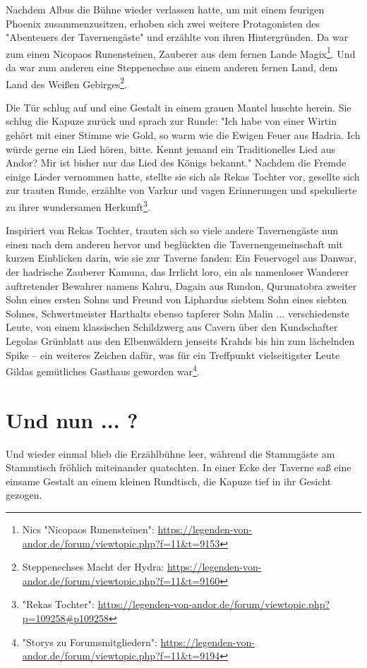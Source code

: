 Nachdem Albus die Bühne wieder verlassen hatte, um mit einem feurigen Phoenix zusammenzusitzen, erhoben sich zwei weitere Protagonisten des "Abenteuers der Tavernengäste" und erzählte von ihren Hintergründen. Da war zum einen Nicopaos Runensteinen, Zauberer aus dem fernen Lande Magix\footnote{Nics "Nicopaos Runensteinen": \url{https://legenden-von-andor.de/forum/viewtopic.php?f=11&t=9153}}. Und da war zum anderen eine Steppenechse aus einem anderen fernen Land, dem Land des Weißen Gebirges\footnote{Steppenechses Macht der Hydra: \url{https://legenden-von-andor.de/forum/viewtopic.php?f=11&t=9160}}.

Die Tür schlug auf und eine Gestalt in einem grauen Mantel huschte herein. Sie schlug die Kapuze zurück und sprach zur Runde: "Ich habe von einer Wirtin gehört mit einer Stimme wie Gold, so warm wie die Ewigen Feuer aus Hadria. Ich würde gerne ein Lied hören, bitte. Kennt jemand ein Traditionelles Lied aus Andor? Mir ist bisher nur das Lied des Königs bekannt." Nachdem die Fremde einige Lieder vernommen hatte, stellte sie sich als Rekas Tochter vor, gesellte sich zur trauten Runde, erzählte von Varkur und vagen Erinnerungen und spekulierte zu ihrer wundersamen Herkunft\footnote{"Rekas Tochter": \url{https://legenden-von-andor.de/forum/viewtopic.php?p=109258\#p109258}}. 

Inspiriert von Rekas Tochter, trauten sich so viele andere Tavernengäste nun einen nach dem anderen hervor und beglückten die Tavernengemeinschaft mit kurzen Einblicken darin, wie sie zur Taverne fanden: Ein Feuervogel aus Danwar, der hadrische Zauberer Kamuna, das Irrlicht loro, ein als namenloser Wanderer auftretender Bewahrer namens Kahru, Dagain aus Rundon, Qurunatobra zweiter Sohn eines ersten Sohns und Freund von Liphardus siebtem Sohn eines siebten Sohnes, Schwertmeister Harthalts ebenso tapferer Sohn Malin ... verschiedenste Leute, von einem klassischen Schildzwerg aus Cavern über den Kundschafter Legolas Grünblatt aus den Elbenwäldern jenseits Krahds bis hin zum lächelnden Spike -- ein weiteres Zeichen dafür, was für ein Treffpunkt vielseitigster Leute Gildas gemütliches Gasthaus geworden war\footnote{"Storys zu Forumsmitgliedern": \url{https://legenden-von-andor.de/forum/viewtopic.php?f=11&t=9194}}.

\newpage
\section{Und nun ... ?}

Und wieder einmal blieb die Erzählbühne leer, während die Stammgäste am Stammtisch fröhlich miteinander quatschten. In einer Ecke der Taverne saß eine einsame Gestalt an einem kleinen Rundtisch, die Kapuze tief in ihr Gesicht gezogen. 

